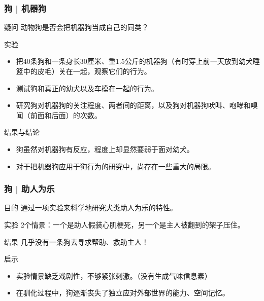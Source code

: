 \begin{frame}
  \frametitle{狗 | 机器狗}
  \begin{block}{疑问}
    动物狗是否会把机器狗当成自己的同类？
  \end{block}
  \pause
  \begin{block}{实验}
    \begin{itemize}
      \item 把40条狗和一条身长30厘米、重1.5公斤的机器狗（有时穿上前一天放到幼犬睡篮中的皮毛）关在一起，观察它们的行为。
      \item 测试狗和真正的幼犬以及车模在一起的行为。
      \item 研究狗对机器狗的关注程度、两者间的距离，以及狗对机器狗吠叫、咆哮和嗅闻（前面和后面）的次数。
    \end{itemize}
  \end{block}
  \pause
  \begin{block}{结果与结论}
    \begin{itemize}
      \item 狗虽然对机器狗有反应，程度上却显然要弱于面对幼犬。
      \item 对于把机器狗应用于狗行为的研究中，尚存在一些重大的局限。
    \end{itemize}
  \end{block}
\end{frame}

\begin{frame}
  \frametitle{狗 | 助人为乐}
  \begin{block}{目的}
    通过一项实验来科学地研究犬类助人为乐的特性。
  \end{block}
  \pause
  \begin{block}{实验}
    2个情景：一个是助人假装心肌梗死，另一个是主人被翻到的架子压住。
  \end{block}
  \pause
  \begin{block}{结果}
    几乎没有一条狗去寻求帮助、救助主人！
  \end{block}
  \pause
  \begin{block}{启示}
    \begin{itemize}
      \item 实验情景缺乏戏剧性，不够紧张刺激。（没有生成气味信息素）
      \item 在驯化过程中，狗逐渐丧失了独立应对外部世界的能力、空间记忆。
    \end{itemize}
  \end{block}
\end{frame}

